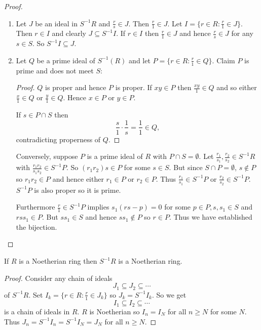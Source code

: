 \documentclass[a4paper]{article}
\begin{document}
\begin{proof}\leavevmode
  \begin{enumerate}
  \item Let \(J\) be an ideal in \(S^{-1}R\) and \(\frac{r}{s} \in J\). Then \(\frac{r}{1} \in J\). Let \(I = \{r \in R: \frac{r}{1} \in J\}\). Then \(r \in I\) and clearly \(J \subseteq S^{-1}I\). If \(r \in I\) then \(\frac{r}{1} \in J\) and hence \(\frac{r}{s} \in J\) for any \(s \in S\). So \(S^{-1}I \subseteq J\).
  \item Let \(Q\) be a prime ideal of \(S^{-1}(R)\) and let \(P = \{r \in R: \frac{r}{1} \in Q\}\). Claim \(P\) is prime and does not meet \(S\):
    \begin{proof}
      \(Q\) is proper and hence \(P\) is proper. If \(xy \in P\) then \(\frac{xy}{1} \in Q\) and so either \(\frac{x}{1} \in Q\) or \(\frac{y}{1} \in Q\). Hence \(x \in P\) or \(y \in P\).

      If \(s \in P \cap S\) then
      \[
        \frac{s}{1} \cdot \frac{1}{s} = \frac{1}{1} \in Q,
      \]
      contradicting properness of \(Q\).
    \end{proof}

    Conversely, suppose \(P\) is a prime ideal of \(R\) with \(P \cap S = \emptyset\). Let \(\frac{r_1}{s_1}, \frac{r_2}{s_2} \in S^{-1}R\) with \(\frac{r_1r_2}{s_1s_2} \in S^{-1}P\). So \((r_1r_2)s \in P\) for some \(s \in S\). But since \(S \cap P = \emptyset\), \(s \notin P\) so \(r_1r_2 \in P\) and hence either \(r_1 \in P\) or \(r_2 \in P\). Thus \(\frac{r_1}{s_1} \in S^{-1}P\) or \(\frac{r_2}{s_2} \in S^{-1}P\). \(S^{-1}P\) is also proper so it is prime.

    Furthermore \(\frac{r}{1} \in S^{-1}P\) implies \(s_1(rs - p) = 0\) for some \(p \in P, s, s_1 \in S\) and \(rss_1 \in P\). But \(ss_1 \in S\) and hence \(ss_1 \notin P\) so \(r \in P\). Thus we have established the bijection.
  \end{enumerate}
\end{proof}

\begin{lemma}
  If \(R\) is a Noetherian ring then \(S^{-1}R\) is a Noetherian ring.
\end{lemma}

\begin{proof}
  Consider any chain of ideals
  \[
    J_1 \subseteq J_2 \subseteq \cdots
  \]
  of \(S^{-1}R\). Set \(I_k = \{r \in R: \frac{r}{1} \in J_k\}\) so \(J_k = S^{-1}I_k\). So we get
  \[
    I_1 \subseteq I_2 \subseteq \cdots
  \]
  is a chain of ideals in \(R\). \(R\) is Noetherian so \(I_n = I_N\) for all \(n \geq N\) for some \(N\). Thus \(J_n = S^{-1}I_n = S^{-1}I_N = J_N\) for all \(n \geq N\).
\end{proof}
\end{document}
